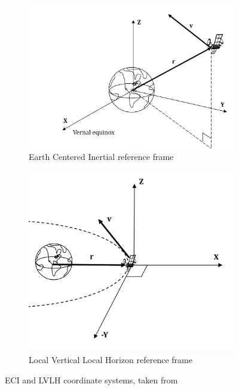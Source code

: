\begin{figure}[!h]
    \begin{subfigure}{0.54\linewidth}
    \includegraphics[width = \linewidth]{Images/ECI.PNG}
    \caption{Earth Centered Inertial reference frame}
    \label{fig:ECI}
    \end{subfigure}\hfill
    \begin{subfigure}{0.43\linewidth}
    \includegraphics[width = \linewidth]{Images/LVLH.PNG}
    \caption{Local Vertical Local Horizon reference frame}
    \label{fig:LVLH}
    \end{subfigure}
    \caption{ECI and LVLH coordinate systems, taken from \cite{alfriend2009spacecraft}}
    \label{fig:orbitrefs}
\end{figure}
